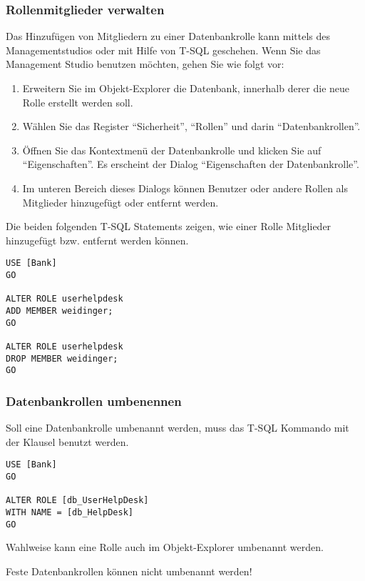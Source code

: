         \subsubsection{Rollenmitglieder verwalten}
          Das Hinzufügen von Mitgliedern zu einer Datenbankrolle kann mittels
          des Managementstudios oder mit Hilfe von T-SQL geschehen. Wenn Sie das
          Management Studio benutzen möchten, gehen Sie wie folgt vor:
          \begin{enumerate}
            \item Erweitern Sie im Objekt-Explorer die Datenbank, innerhalb
            derer die neue Rolle erstellt werden soll.
            \item Wählen Sie das Register \enquote{Sicherheit},
            \enquote{Rollen} und darin \enquote{Datenbankrollen}.
            \item Öffnen Sie das Kontextmenü der Datenbankrolle und klicken Sie
            auf \enquote{Eigenschaften}. Es erscheint der Dialog
            \enquote{Eigenschaften der Datenbankrolle}.
            \item Im unteren Bereich dieses Dialogs können Benutzer oder andere
            Rollen als Mitglieder hinzugefügt oder entfernt werden.
          \end{enumerate}
          Die beiden folgenden T-SQL Statements zeigen, wie einer Rolle
          Mitglieder hinzugefügt bzw. entfernt werden können.
          \begin{lstlisting}[language=ms_sql, caption={Ändern einer
           Datenbankrolle}, label=admin19_10]
USE [Bank]
GO

ALTER ROLE userhelpdesk
ADD MEMBER weidinger;
GO

ALTER ROLE userhelpdesk
DROP MEMBER weidinger;
GO
        \end{lstlisting}
        \subsubsection{Datenbankrollen umbenennen}
          Soll eine Datenbankrolle umbenannt werden, muss das T-SQL Kommando
           mit der Klausel 
          benutzt werden.
          \begin{lstlisting}[language=ms_sql, caption={Umbenennen einer
           Datenbankrolle}, label=admin19_11]
USE [Bank]
GO

ALTER ROLE [db_UserHelpDesk] 
WITH NAME = [db_HelpDesk]
GO
          \end{lstlisting}
          Wahlweise kann eine Rolle auch im Objekt-Explorer umbenannt werden.
          \begin{merke}
            Feste Datenbankrollen können nicht umbenannt werden!
          \end{merke}
          \begin{literaturinternet}
            \item \cite{ms189775}
          \end{literaturinternet}
